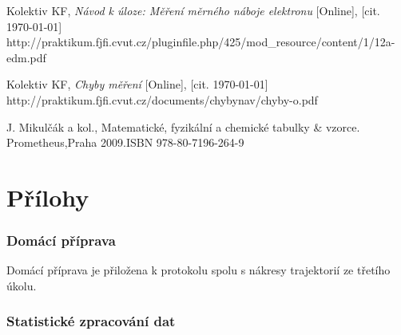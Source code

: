 \documentclass[english]{article}
\begin{document}
\begin{thebibliography}{9}
 Kolektiv KF, \emph{Návod k úloze: Měření měrného náboje elektronu} [Online], [cit. \today] \newline http://praktikum.fjfi.cvut.cz/pluginfile.php/425/mod\_resource/content/1/12a-edm.pdf



 Kolektiv KF, \emph{Chyby měření} [Online], [cit. \today] \newline http://praktikum.fjfi.cvut.cz/documents/chybynav/chyby-o.pdf


 J. Mikulčák a kol., Matematické, fyzikální a chemické tabulky \& vzorce. Prometheus,Praha 2009.\newline ISBN 978-80-7196-264-9


\end{thebibliography}
\endgroup
\setcounter{equation}{0}
\clearpage
\part*{Přílohy}

\section{Domácí příprava}
	Domácí příprava je přiložena k protokolu spolu s nákresy trajektorií ze třetího úkolu.
\section{Statistické zpracování dat}
\end{document}
